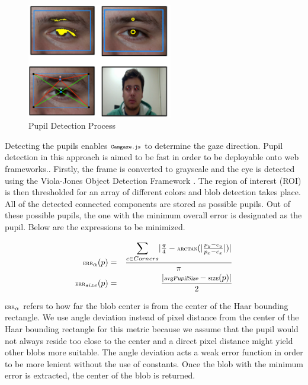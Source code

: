 \documentclass[annual]{acmsiggraph}
\newcommand{\Acronym}[1]{\ensuremath{{\small{\texttt{#1}}}}}
\newcommand{\Name}{\Acronym{Camgaze.js}} \newcommand{\False}{\Constant{false}}
\newcommand{\Function}[1]{\ensuremath{{\small \textsc{#1}}}}
\newcommand{\Constant}[1]{\ensuremath{\small{\texttt{#1}}}}
\newcommand{\Var}[1]{\ensuremath{{\small{\textsl{#1}}}}}
\begin{document}
\begin{figure}[ht]

    \centering

    \includegraphics[width=2.5in]{figs/pupilDetection.pdf}

    \caption{Pupil Detection Process}

\end{figure}

Detecting the pupils enables $\Name$ to determine the gaze direction.
Pupil detection in this approach is aimed to be fast in order to be deployable
onto web frameworks.. Firstly, the frame is converted to grayscale and the eye
is detected using the Viola-Jones Object Detection Framework \cite{Viola01}.
The region of interest (ROI) is then thresholded for an array of different
colors and blob detection takes place. All of the detected connected components
are stored as possible pupils. Out of these possible pupils, the one with the
minimum overall error is designated as the pupil.  Below are the expressions to
be minimized.

\begin{eqnarray}
\Function{err}_{\alpha}(p) &=& \frac{
    \mathlarger{\sum}_{c \in Corners}{
        \vert
            \frac{\pi}{4} - \Function{arctan}(
                \vert \frac{p_y - c_y}{p_x - c_x} \vert
            )
        \vert
    } }{\pi} \\ \Function{err}_{size}(p) &=& \frac{ \vert \Var{avgPupilSize} -
    \Function{size}(p) \vert }{2} \end{eqnarray}

$\Function{err}_{\alpha}$ refers to how far the blob center is from the
center of the Haar bounding rectangle. We use angle deviation instead of pixel
distance from the center of the Haar bounding rectangle for this metric because
we assume that the pupil would not always reside too close to the center and a
direct pixel distance might yield other blobs more suitable. The angle
deviation acts a weak error function in order to be more lenient without the
use of constants.  Once the blob with the minimum error is extracted, the
center of the blob is returned.
\end{document}
